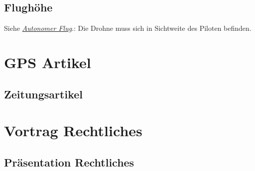 \documentclass[letterpaper,11pt,ngerman]{andi}
\begin{document}
\section{Flughöhe}
\label{included_projects/rechtliches/RECHTLICHES_SPEC/content:flughohe}
Siehe {\hyperref[included_projects/rechtliches/RECHTLICHES_SPEC/content:autonomous]{\emph{Autonomer Flug}}}.:
Die Drohne muss sich in Sichtweite des Piloten befinden.
\begin{appendix}
\renewcommand\thechapter{\Alph{chapter}}

\chapter{GPS Artikel}
\label{index:gps-artikel}

\section{Zeitungsartikel}
\label{included_projects/gps/GPS_SPEC/appendix::doc}\label{included_projects/gps/GPS_SPEC/appendix:zeitungsartikel}











\chapter{Vortrag Rechtliches}
\label{index:vortrag-rechtliches}

\section{Präsentation Rechtliches}
\label{included_projects/rechtliches/RECHTLICHES_SPEC/appendix:prasentation-rechtliches}\label{included_projects/rechtliches/RECHTLICHES_SPEC/appendix::doc}

\end{appendix}





\renewcommand{\indexname}{Stichwortverzeichnis}
\printindex
\end{document}
